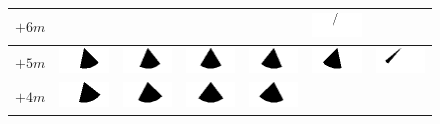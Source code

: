 \begin{figure}
	\centering
	\begin{tabular}{|c|c|c|c|c|c|c|}
		\hline 
		$+6m$ & & & & & \includegraphics[width=1.4cm]{PosWinkelVideo/Winkel_V_-200_600.png}& \\ 
		\hline 
		$+5m$ &
		\includegraphics[width=1.4cm]{PosWinkelVideo/Winkel_V_200_500.png}&
		\includegraphics[width=1.4cm]{PosWinkelVideo/Winkel_V_100_500.png}&
		\includegraphics[width=1.4cm]{PosWinkelVideo/Winkel_V_0_500.png}&
		\includegraphics[width=1.4cm]{PosWinkelVideo/Winkel_V_-100_500.png}&
		\includegraphics[width=1.4cm]{PosWinkelVideo/Winkel_V_-200_500.png}&
		\includegraphics[width=1.4cm]{PosWinkelVideo/Winkel_V_-300_500.png}\\ 
		\hline 
		$+4m$ &
		\includegraphics[width=1.4cm]{PosWinkelVideo/Winkel_V_200_400.png}&
		\includegraphics[width=1.4cm]{PosWinkelVideo/Winkel_V_100_400.png}&
		\includegraphics[width=1.4cm]{PosWinkelVideo/Winkel_V_0_400.png}&
		\includegraphics[width=1.4cm]{PosWinkelVideo/Winkel_V_-100_400.png}&

\end{tabular}
\end{figure}
